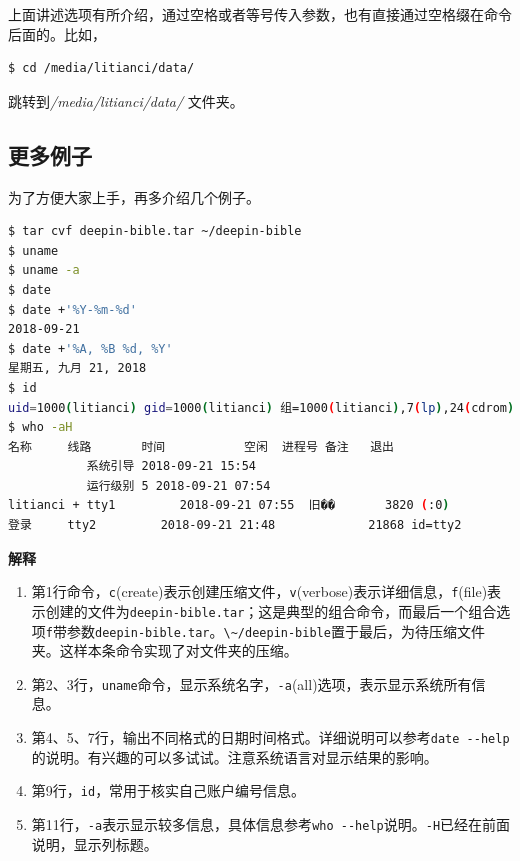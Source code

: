 \documentclass[doctor,openright,twoside]{sjtuthesis}
\providecommand{\tightlist}{%
    \setlength{\itemsep}{0pt}\setlength{\parskip}{0pt}}
\newcommand{\passthrough}[1]{#1}
\theoremstyle{plain}
\theoremstyle{definition}
\theoremstyle{remark}
\theoremstyle{ocrenumbox}
\theoremstyle{plain}
\begin{document}
上面讲述选项有所介绍，通过空格或者等号传入参数，也有直接通过空格缀在命令后面的。比如，

\begin{lstlisting}[language=bash]
$ cd /media/litianci/data/
\end{lstlisting}

跳转到\emph{/media/litianci/data/} 文件夹。

\hypertarget{shell:more-example}{%
\subsection{更多例子}\label{shell:more-example}}

为了方便大家上手，再多介绍几个例子。

\begin{lstlisting}[language=bash]
$ tar cvf deepin-bible.tar ~/deepin-bible
$ uname
$ uname -a
$ date
$ date +'%Y-%m-%d'
2018-09-21
$ date +'%A, %B %d, %Y'
星期五, 九月 21, 2018
$ id
uid=1000(litianci) gid=1000(litianci) 组=1000(litianci),7(lp),24(cdrom),27(sudo)
$ who -aH
名称     线路       时间           空闲  进程号 备注   退出
           系统引导 2018-09-21 15:54
           运行级别 5 2018-09-21 07:54
litianci + tty1         2018-09-21 07:55  旧��       3820 (:0)
登录     tty2         2018-09-21 21:48             21868 id=tty2
\end{lstlisting}

\textbf{解释}

\begin{enumerate}
\def\labelenumi{\arabic{enumi}.}
\tightlist
\item
  第1行命令，\passthrough{\lstinline!c!}(create)表示创建压缩文件，\passthrough{\lstinline!v!}(verbose)表示详细信息，\passthrough{\lstinline!f!}(file)表示创建的文件为\passthrough{\lstinline!deepin-bible.tar!}；这是典型的组合命令，而最后一个组合选项\passthrough{\lstinline!f!}带参数\passthrough{\lstinline!deepin-bible.tar!}。\passthrough{\lstinline!\~/deepin-bible!}置于最后，为待压缩文件夹。这样本条命令实现了对文件夹的压缩。
\item
  第2、3行，\passthrough{\lstinline!uname!}命令，显示系统名字，\passthrough{\lstinline!-a!}(all)选项，表示显示系统所有信息。
\item
  第4、5、7行，输出不同格式的日期时间格式。详细说明可以参考\passthrough{\lstinline!date --help!}的说明。有兴趣的可以多试试。注意系统语言对显示结果的影响。
\item
  第9行，\passthrough{\lstinline!id!}，常用于核实自己账户编号信息。
\item
  第11行，\passthrough{\lstinline!-a!}表示显示较多信息，具体信息参考\passthrough{\lstinline!who --help!}说明。\passthrough{\lstinline!-H!}已经在前面说明，显示列标题。
\end{enumerate}
\end{document}
